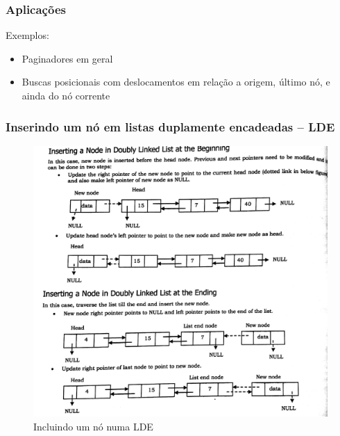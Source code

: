 \begin{frame}
\frametitle{Aplicações}

\begin{block}{Exemplos:}
\begin{itemize}
  \item Paginadores em geral
  \item Buscas posicionais com deslocamentos em relação a origem,
  último nó, e ainda do nó corrente
\end{itemize}
\end{block}

\end{frame} 



\begin{frame}%

\frametitle{Inserindo um nó em listas duplamente encadeadas -- LDE}

\begin{figure}[!hb]
	\centering

	\includegraphics[height=0.650\paperheight, width=0.77\paperwidth]{figs/fig_listas/insercao_LDE}						
			\caption{Incluindo um nó numa LDE}	
		\end{figure} 

\end{frame} 


